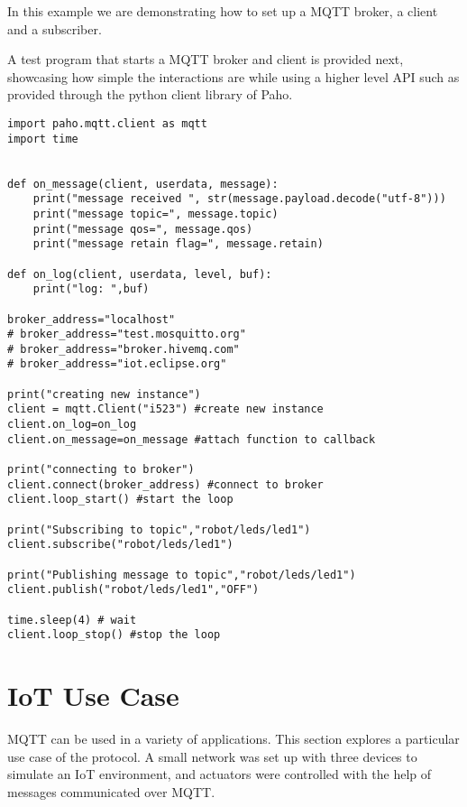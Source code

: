 In this example we are demonstrating how to set up a MQTT broker, a
client and a subscriber.



A test program that starts a MQTT broker and client is provided next,
showcasing how simple the interactions are while using a higher level
API such as provided through the python client library of Paho.

\begin{lstlisting}
import paho.mqtt.client as mqtt 
import time


def on_message(client, userdata, message):
    print("message received ", str(message.payload.decode("utf-8")))
    print("message topic=", message.topic)
    print("message qos=", message.qos)
    print("message retain flag=", message.retain)

def on_log(client, userdata, level, buf):
    print("log: ",buf)

broker_address="localhost"    
# broker_address="test.mosquitto.org"
# broker_address="broker.hivemq.com"
# broker_address="iot.eclipse.org"

print("creating new instance")
client = mqtt.Client("i523") #create new instance
client.on_log=on_log
client.on_message=on_message #attach function to callback

print("connecting to broker")
client.connect(broker_address) #connect to broker
client.loop_start() #start the loop

print("Subscribing to topic","robot/leds/led1")
client.subscribe("robot/leds/led1")

print("Publishing message to topic","robot/leds/led1")
client.publish("robot/leds/led1","OFF")

time.sleep(4) # wait
client.loop_stop() #stop the loop
\end{lstlisting}

\section{IoT Use Case}

MQTT can be used in a variety of applications. This section explores a
particular use case of the protocol. A small network was set up with
three devices to simulate an IoT environment, and actuators were
controlled with the help of messages communicated over MQTT.

